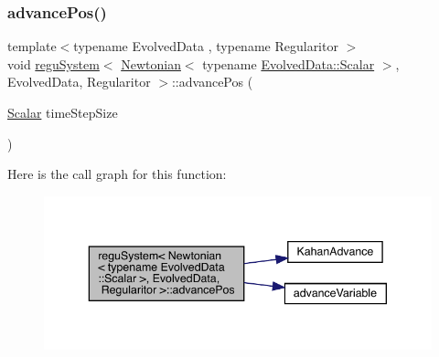 \subsubsection{\texorpdfstring{advance\+Pos()}{advancePos()}}
{\footnotesize\ttfamily template$<$typename Evolved\+Data , typename Regularitor $>$ \\
void \mbox{\hyperlink{classregu_system}{regu\+System}}$<$ \mbox{\hyperlink{class_newtonian}{Newtonian}}$<$ typename \mbox{\hyperlink{classregu_system_aca8ee2c387943164ee3ea68370fc3ac0}{Evolved\+Data\+::\+Scalar}} $>$, Evolved\+Data, Regularitor $>$\+::advance\+Pos (\begin{DoxyParamCaption}\item[{\mbox{\hyperlink{classregu_system_3_01_newtonian_3_01typename_01_evolved_data_1_1_scalar_01_4_00_01_evolved_data_00_01_regularitor_01_4_a6993f135075541f441a7642845b183a5}{Scalar}}}]{time\+Step\+Size }\end{DoxyParamCaption})}

Here is the call graph for this function\+:
\nopagebreak
\begin{figure}[H]
\begin{center}
\leavevmode
\includegraphics[width=343pt]{classregu_system_3_01_newtonian_3_01typename_01_evolved_data_1_1_scalar_01_4_00_01_evolved_data_00_01_regularitor_01_4_ae0b6977439ce7171e5ef5767237e050d_cgraph}
\end{center}
\end{figure}
\mbox{\label{classregu_system_3_01_newtonian_3_01typename_01_evolved_data_1_1_scalar_01_4_00_01_evolved_data_00_01_regularitor_01_4_a04de03e59e9369cae79251b8ab876c2c}} 
